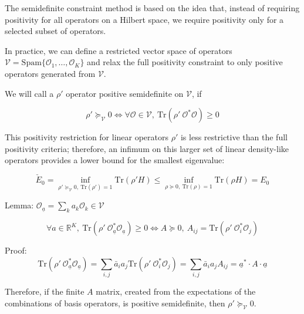 \documentclass{article}
\theoremstyle{definition}
\begin{document}
The semidefinite constraint method is based on the idea that, instead of requiring positivity for all operators on a Hilbert space, we require positivity only for a selected subset of operators.

In practice, we can define a restricted vector space of operators $\mathcal{V}=\mathrm{Spam} \{ \mathcal{O}_1,\dots, \mathcal{O}_K\}$ and relax the full positivity constraint to only positive operators generated from $\mathcal{V}$.

We will call a $\rho'$ operator positive semidefinite on $\mathcal{V}$, if

\begin{equation}
    \rho' \succcurlyeq_\mathcal{V} 0
    \iff
    \forall \mathcal{O} \in \mathcal{V}, \ \mathrm{Tr}(\rho' \ \mathcal{O}^* \mathcal{O})
    \ge
    0
\end{equation}

This positivity restriction for linear operators $\rho'$ is less restrictive than the full positivity criteria; therefore, an infimum on this larger set of linear density-like operators provides a lower bound for the smallest eigenvalue:

\begin{equation}
    \check{E}_0
    =
    \inf_{\rho' \succcurlyeq_\mathcal{V} 0, \  \mathrm{Tr} (\rho') = 1} \mathrm{Tr}(\rho' H)
    \le
    \inf_{\rho \succcurlyeq 0, \  \mathrm{Tr} (\rho) = 1} \mathrm{Tr}(\rho H)
    =
    E_0
\end{equation}

Lemma:
$\mathcal{O}_{\underline{a}} = \sum_k a_k \mathcal{O}_k \in \mathcal{V}$

\begin{equation}
    \forall a \in \mathbb{R}^K, \ 
    \mathrm{Tr} ( \rho' \ \mathcal{O}_{\underline{a}}^* \mathcal{O}_{\underline{a}} )
    \ge 0
    \iff
    A \succcurlyeq 0, \ A_{ij} = \mathrm{Tr} ( \rho' \ \mathcal{O}_i^* \mathcal{O}_j )
\end{equation}

Proof:
\begin{equation}
    \mathrm{Tr} ( \rho' \ \mathcal{O}_{\underline{a}}^* \mathcal{O}_{\underline{a}} )
    =
    \sum_{i,j} \bar{a}_i a_j \mathrm{Tr} ( \rho' \ \mathcal{O}_i^* \mathcal{O}_j )
    =
    \sum_{i,j} \bar{a}_i a_j A_{ij}
    =
    \underline{a}^* \cdot A \cdot \underline{a}
\end{equation}

Therefore, if the finite $A$ matrix, created from the expectations of the combinations of basis operators, is positive semidefinite, then $\rho' \succcurlyeq_\mathcal{V} 0$.
\end{document}
